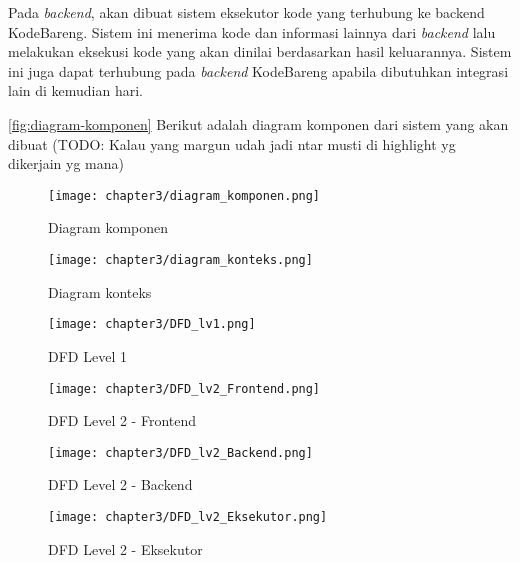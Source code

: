 Pada \textit{backend}, akan dibuat sistem eksekutor kode yang terhubung ke backend KodeBareng. Sistem ini menerima kode dan informasi lainnya dari \textit{backend} lalu melakukan eksekusi kode yang akan dinilai berdasarkan hasil keluarannya. Sistem ini juga dapat terhubung pada \textit{backend} KodeBareng apabila dibutuhkan integrasi lain di kemudian hari.

\autoref{fig:diagram-komponen} Berikut adalah diagram komponen dari sistem yang akan dibuat (TODO: Kalau yang margun udah jadi ntar musti di highlight yg dikerjain yg mana)

\begin{figure}[H]
  \centering
  \texttt{[image: chapter3/diagram\_komponen.png]}
  \caption{Diagram komponen} \label{fig:diagram-komponen}
\end{figure}

\blindtext

\begin{figure}[H]
  \centering
  \texttt{[image: chapter3/diagram\_konteks.png]}
  \caption{Diagram konteks} \label{fig:diagram-konteks}
\end{figure}

\begin{figure}[H]
  \centering
  \texttt{[image: chapter3/DFD\_lv1.png]}
  \caption{DFD Level 1} \label{fig:dfd-lv1}
\end{figure}

\begin{figure}[H]
  \centering
  \texttt{[image: chapter3/DFD\_lv2\_Frontend.png]}
  \caption{DFD Level 2 - Frontend} \label{fig:dfd-lv2-frontend}
\end{figure}

\begin{figure}[H]
  \centering
  \texttt{[image: chapter3/DFD\_lv2\_Backend.png]}
  \caption{DFD Level 2 - Backend} \label{fig:dfd-lv2-backend}
\end{figure}

\begin{figure}[H]
  \centering
  \texttt{[image: chapter3/DFD\_lv2\_Eksekutor.png]}
  \caption{DFD Level 2 - Eksekutor} \label{fig:dfd-lv2-eksekutor}
\end{figure}

